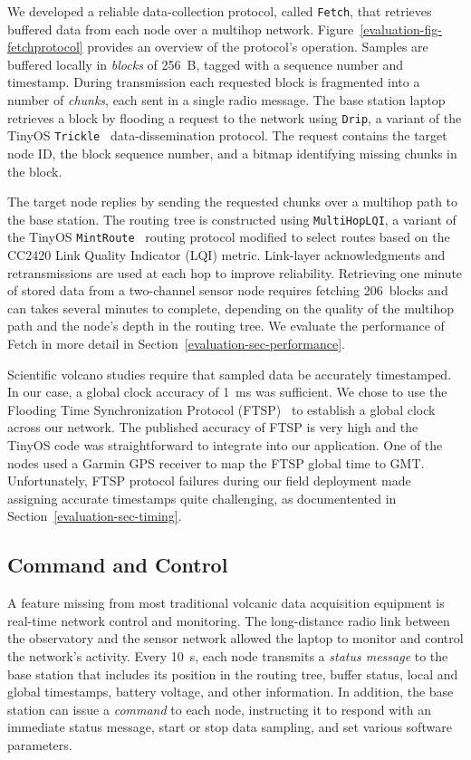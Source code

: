 We developed a reliable data-collection protocol, called \texttt{Fetch}, that
retrieves buffered data from each node over a multihop network.
Figure~\ref{evaluation-fig-fetchprotocol} provides an overview of the
protocol's operation. Samples are buffered locally in \textit{blocks} of
256~B, tagged with a sequence number and timestamp. During transmission each
requested block is fragmented into a number of \textit{chunks}, each sent in
a single radio message. The base station laptop retrieves a block by flooding
a request to the network using \texttt{Drip}, a variant of the TinyOS
\texttt{Trickle}~\cite{trickle} data-dissemination protocol. The request
contains the target node ID, the block sequence number, and a bitmap
identifying missing chunks in the block.

The target node replies by sending the requested chunks over a multihop path
to the base station. The routing tree is constructed using
\texttt{MultiHopLQI}, a variant of the TinyOS
\texttt{MintRoute}~\cite{awoo-multihop} routing protocol modified to select
routes based on the CC2420 Link Quality Indicator (LQI) metric. Link-layer
acknowledgments and retransmissions are used at each hop to improve
reliability. Retrieving one minute of stored data from a two-channel sensor
node requires fetching 206~blocks and can takes several minutes to complete,
depending on the quality of the multihop path and the node's depth in the
routing tree. We evaluate the performance of Fetch in more detail in
Section~\ref{evaluation-sec-performance}.

Scientific volcano studies require that sampled data be accurately
timestamped. In our case, a global clock accuracy of 1~ms was sufficient. We
chose to use the Flooding Time Synchronization Protocol (FTSP)~\cite{ftsp} to
establish a global clock across our network. The published accuracy of FTSP
is very high and the TinyOS code was straightforward to integrate into our
application. One of the nodes used a Garmin GPS receiver to map the FTSP
global time to GMT. Unfortunately, FTSP protocol failures during our field
deployment made assigning accurate timestamps quite challenging, as
documentented in Section~\ref{evaluation-sec-timing}.

\subsection{Command and Control}

A feature missing from most traditional volcanic data acquisition equipment
is real-time network control and monitoring. The long-distance radio link
between the observatory and the sensor network allowed the laptop to monitor
and control the network's activity. Every 10~s, each node transmits a
\textit{status message} to the base station that includes its position in the
routing tree, buffer status, local and global timestamps, battery voltage,
and other information. In addition, the base station can issue a
\textit{command} to each node, instructing it to respond with an immediate
status message, start or stop data sampling, and set various software
parameters.

